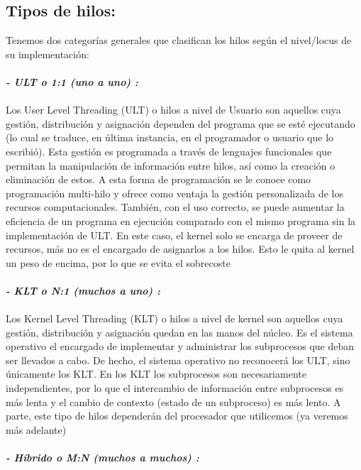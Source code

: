 \documentclass[12pt]{article}
\begin{document}
\begin{multicols}{2}
\subsection*{Tipos de hilos: }
Tenemos dos categorías generales que clasifican los hilos según el nivel/locus de su implementación:\\\\
\textbf{\textsl{- ULT o 1:1 (uno a uno) : }}\\\\
\indent Los User Level Threading (ULT) o hilos a nivel de Usuario son aquellos cuya gestión, distribución y asignación dependen del programa que se esté ejecutando (lo cual se traduce, en última instancia, en el programador o usuario que lo escribió). Esta gestión es programada a través de lenguajes funcionales que permitan la manipulación de información entre hilos, así como la creación o eliminación de estos. A esta forma de programación se le conoce como programación multi-hilo y ofrece como ventaja la gestión personalizada de los recursos computacionales. También, con el uso correcto, se puede aumentar la eficiencia de un programa en ejecución comparado con el mismo programa sin la implementación de ULT. En este caso, el kernel solo se encarga de proveer de recursos, más no es el encargado de asignarlos a los hilos. Esto le quita al kernel un peso de encima, por lo que se evita el sobrecoste \cite{Sil}\\\\
\textbf{\textsl{- KLT o N:1 (muchos a uno) : }}\\\\
\indent Los Kernel Level Threading (KLT) o hilos a nivel de kernel son aquellos cuya gestión, distribución y asignación quedan en las manos del núcleo. Es el sistema operativo el encargado de implementar y administrar los subprocesos que deban ser llevados a cabo. De hecho, el sistema operativo no reconocerá los ULT, sino únicamente los KLT. En los KLT los subprocesos son necesariamente independientes, por lo que el intercambio de información entre subprocesos es más lenta y el cambio de contexto (estado de un subproceso) es más lento. A parte, este tipo de hilos dependerán del procesador que utilicemos (ya veremos más adelante) \cite{Sil}\\\\
\textbf{\textsl{- Híbrido o M:N (muchos a muchos) : }}\\\\

\end{multicols}
\end{document}
